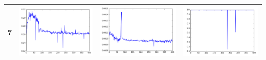 \documentclass[14pt, a4paper]{extarticle}
\begin{document}
\begin{table}[!htb]
{\begin{tabular}{|c|c|c|c|}
\hline
7 & \includegraphics[scale=0.3]{images/ks_7.png} & \includegraphics[scale=0.3]{images/cvm_7.png} & \includegraphics[scale=0.3]{images/auc_7.png} \\
\hline
\end{tabular}
}
\end{table}
\end{document}
